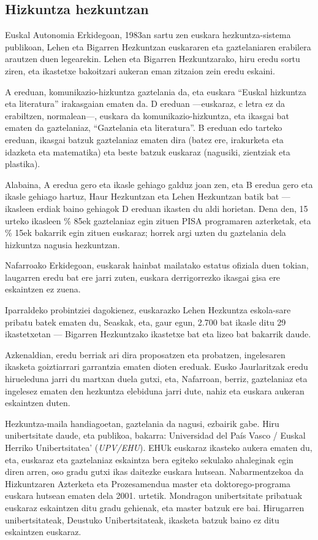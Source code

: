 \begin{multicols}{2}
\subsection{Hizkuntza hezkuntzan}
Euskal Autonomia Erkidegoan, 1983an sartu zen euskara hezkuntza-sistema publikoan, Lehen eta Bigarren Hezkuntzan euskararen eta gaztelaniaren erabilera arautzen duen legearekin. Lehen eta Bigarren Hezkuntzarako, hiru eredu sortu ziren, eta ikastetxe bakoitzari aukeran eman zitzaion zein eredu eskaini. 

A ereduan, komunikazio-hizkuntza gaztelania da, eta euskara “Euskal hizkuntza eta literatura” irakasgaian ematen da. D ereduan —euskaraz, c letra ez da erabiltzen, normalean—, euskara da komunikazio-hizkuntza, eta ikasgai bat ematen da gaztelaniaz, “Gaztelania eta literatura”. B ereduan edo tarteko ereduan, ikasgai batzuk gaztelaniaz ematen dira (batez ere, irakurketa eta idazketa eta matematika) eta beste batzuk euskaraz (nagusiki, zientziak eta plastika). 

Alabaina, A eredua gero eta ikasle gehiago galduz joan zen, eta B eredua gero eta ikasle gehiago hartuz, Haur Hezkuntzan eta Lehen Hezkuntzan batik bat —ikasleen erdiak baino gehiagok D ereduan ikasten du aldi horietan. Dena den, 15 urteko ikasleen \% 85ek gaztelaniaz egin zituen PISA programaren \cite{BAS-Nota12} azterketak, eta \% 15ek bakarrik egin zituen euskaraz; horrek argi uzten du gaztelania dela hizkuntza nagusia hezkuntzan. 

Nafarroako Erkidegoan, euskarak hainbat mailatako estatus ofiziala duen tokian, laugarren eredu bat ere jarri zuten, euskara derrigorrezko ikasgai gisa ere eskaintzen ez zuena. 

Iparraldeko probintziei dagokienez, euskarazko Lehen Hezkuntza eskola-sare pribatu batek ematen du, Seaskak, eta, gaur egun, 2.700 bat ikasle ditu 29 ikastetxetan — Bigarren Hezkuntzako ikastetxe bat eta lizeo bat bakarrik daude. 

Azkenaldian, eredu berriak ari dira proposatzen eta probatzen, ingelesaren ikasketa goiztiarrari garrantzia ematen dioten ereduak. Eusko Jaurlaritzak eredu hirueleduna jarri du martxan duela gutxi, eta, Nafarroan, berriz, gaztelaniaz eta ingelesez ematen den hezkuntza elebiduna jarri dute, nahiz eta euskara aukeran eskaintzen duten.  

Hezkuntza-maila handiagoetan, gaztelania da nagusi, ezbairik gabe. Hiru unibertsitate daude, eta publikoa, bakarra: Universidad del País Vasco / Euskal Herriko Unibertsitatea’ (\textit{UPV/EHU}). EHUk euskaraz ikasteko aukera ematen du, eta, euskaraz eta gaztelaniaz eskaintza bera egiteko sekulako ahaleginak egin diren arren, oso gradu gutxi ikas daitezke euskara hutsean. Nabarmentzekoa da Hizkuntzaren Azterketa eta Prozesamendua \cite{BAS-Nota13}  master eta doktorego-programa euskara hutsean ematen dela 2001. urtetik. Mondragon unibertsitate pribatuak euskaraz eskaintzen ditu gradu gehienak, eta master batzuk ere bai. Hirugarren unibertsitateak, Deustuko Unibertsitateak, ikasketa batzuk baino ez ditu eskaintzen euskaraz.


\end{multicols}
